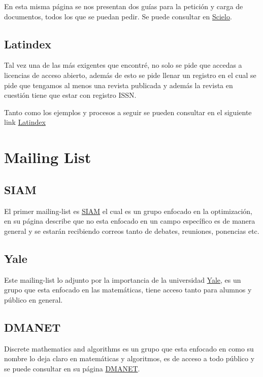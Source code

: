 \documentclass{report}
\begin{document}
En esta misma página se nos presentan dos guías para la petición y carga de documentos, todos los que se puedan pedir. Se puede consultar en \href{https://scielo.org/es/}{Scielo}.

\subsection*{Latindex}
Tal vez una de las más exigentes que encontré, no solo se pide que accedas a licencias de acceso abierto, además de esto se pide llenar un registro en el cual se pide que tengamos al menos una revista publicada y además la revista en cuestión tiene que estar con registro ISSN.

Tanto como los ejemplos y procesos a seguir se pueden consultar en el siguiente link \href{https://www.latindex.org/latindex/inicio}{Latindex}

\section*{Mailing List}
\subsection*{SIAM}
El primer mailing-list es \href{http://lists.siam.org/mailman/listinfo/siam-opt}{SIAM} el cual es un grupo enfocado en la optimización, en su página describe que no esta enfocado en un campo específico es de manera general y se estarán recibiendo correos tanto de debates, reuniones, ponencias etc.

\subsection*{Yale}
Este mailing-list lo adjunto por la importancia de la universidad \href{https://subscribe.yale.edu/login?returnURL=https%3A%2F%2Fsubscribe.yale.edu%2Fbrowse%3Fsearch%3Dmath%2Bdus}{Yale}, es un grupo que esta enfocado en las matemáticas, tiene acceso tanto para alumnos y público en general.

\subsection*{DMANET}
Discrete mathematics and algorithms es un grupo que esta enfocado en como su nombre lo deja claro en matemáticas y algoritmos, es de acceso a todo público y se puede consultar en su página \href{http://www.zaik.uni-koeln.de/mailman/listinfo/dmanet}{DMANET}.
\end{document}
